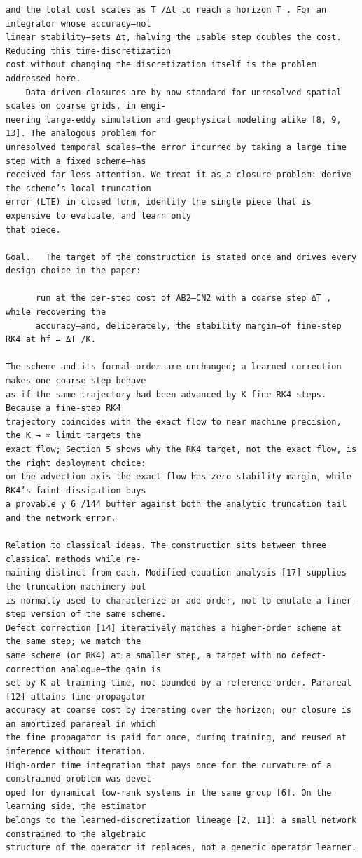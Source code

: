 \documentclass[letterpaper]{article}
\begin{document}
\newpage
\begin{Verbatim}[fontsize=\fontsize{6.35}{7.15}\selectfont,breaklines=false]
and the total cost scales as T /∆t to reach a horizon T . For an integrator whose accuracy—not
linear stability—sets ∆t, halving the usable step doubles the cost. Reducing this time-discretization
cost without changing the discretization itself is the problem addressed here.
    Data-driven closures are by now standard for unresolved spatial scales on coarse grids, in engi-
neering large-eddy simulation and geophysical modeling alike [8, 9, 13]. The analogous problem for
unresolved temporal scales—the error incurred by taking a large time step with a fixed scheme—has
received far less attention. We treat it as a closure problem: derive the scheme’s local truncation
error (LTE) in closed form, identify the single piece that is expensive to evaluate, and learn only
that piece.

Goal.   The target of the construction is stated once and drives every design choice in the paper:

      run at the per-step cost of AB2–CN2 with a coarse step ∆T , while recovering the
      accuracy—and, deliberately, the stability margin—of fine-step RK4 at hf = ∆T /K.

The scheme and its formal order are unchanged; a learned correction makes one coarse step behave
as if the same trajectory had been advanced by K fine RK4 steps. Because a fine-step RK4
trajectory coincides with the exact flow to near machine precision, the K → ∞ limit targets the
exact flow; Section 5 shows why the RK4 target, not the exact flow, is the right deployment choice:
on the advection axis the exact flow has zero stability margin, while RK4’s faint dissipation buys
a provable y 6 /144 buffer against both the analytic truncation tail and the network error.

Relation to classical ideas. The construction sits between three classical methods while re-
maining distinct from each. Modified-equation analysis [17] supplies the truncation machinery but
is normally used to characterize or add order, not to emulate a finer-step version of the same scheme.
Defect correction [14] iteratively matches a higher-order scheme at the same step; we match the
same scheme (or RK4) at a smaller step, a target with no defect-correction analogue—the gain is
set by K at training time, not bounded by a reference order. Parareal [12] attains fine-propagator
accuracy at coarse cost by iterating over the horizon; our closure is an amortized parareal in which
the fine propagator is paid for once, during training, and reused at inference without iteration.
High-order time integration that pays once for the curvature of a constrained problem was devel-
oped for dynamical low-rank systems in the same group [6]. On the learning side, the estimator
belongs to the learned-discretization lineage [2, 11]: a small network constrained to the algebraic
structure of the operator it replaces, not a generic operator learner.


\end{Verbatim}
\end{document}
